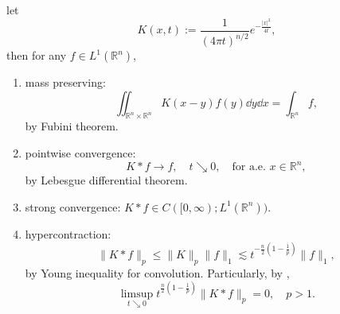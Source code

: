 \begin{proposition}
	let 
	\[
		K(x,t) := \frac{1}{(4\pi t)^{n/2}}e^{-\frac{|x|^2}{4t}},
	\]
	then for any $f\in L^1(\mathbb{R}^n)$,
	\begin{enumerate}
		\item mass preserving: 	
			\[
			\iint_{\mathbb R^n\times\mathbb R^n}K(x-y)f(y)\dd y\dd x 
			= \int_{\mathbb R^n}f,
			\]
			by Fubini theorem.
		\item pointwise convergence: 
		\[
		K*f\to f,\quad{t\searrow0},\quad\text{for a.e. } x\in\mathbb{R}^n,
		\]
		by Lebesgue differential theorem.
		\item strong convergence: $K*f\in C([0,\infty);L^1(\mathbb{R}^n))$.
		\item hypercontraction:
		\[
		\|K*f\|_p\leq \|K\|_p\|f\|_1\lesssim t^{-\frac{n}{2}\left(1-\frac1p\right)}\|f\|_1,
		\]
		by Young inequality for convolution.
		Particularly, by \cite{Giga1988},
		\begin{equation}\label{eq: giga1988}
			\limsup_{t\searrow0}t^{\frac{n}{2}\left(1-\frac1p\right)}\|K*f\|_p = 0,\quad p>1.
		\end{equation}
	\end{enumerate}
\end{proposition}

